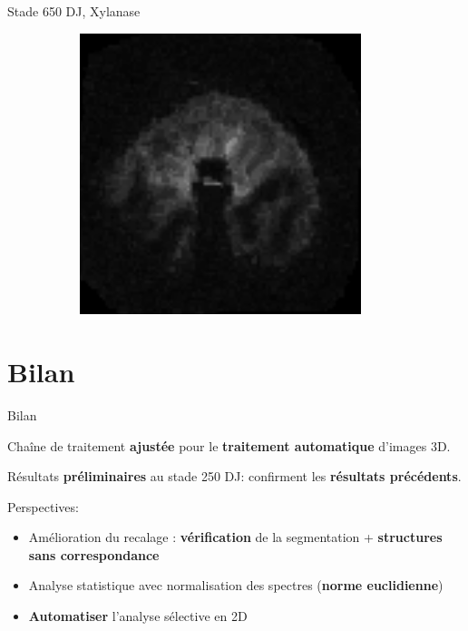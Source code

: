 \documentclass[10pt]{beamer}
\begin{document}
\begin{frame}{Stade 650 DJ, Xylanase}
\begin{figure}[ht]
\begin{subfigure}[t]{0.33\textwidth}
      
    \end{subfigure}%
    \begin{subfigure}[t]{0.33\textwidth}
      \centering
      \includegraphics[width=0.9\textwidth]{fig/stats_500Lich_density}

    \end{subfigure}%
    
  \end{figure}
\end{frame}



\section{Bilan}

\begin{frame}{Bilan}

  Chaîne de traitement \textbf{ajustée} pour le \textbf{traitement automatique} d'images 3D.

  Résultats \textbf{préliminaires} au stade 250 DJ: confirment les \textbf{résultats précédents}.

  \vspace{0.4cm}

  Perspectives:
  \begin{itemize}
  \item Amélioration du recalage : \textbf{vérification} de la segmentation + \textbf{structures sans correspondance}
  \item Analyse statistique avec normalisation des spectres (\textbf{norme euclidienne})
  \item \textbf{Automatiser} l'analyse sélective en 2D
  \end{itemize}


\end{frame}
\end{document}
